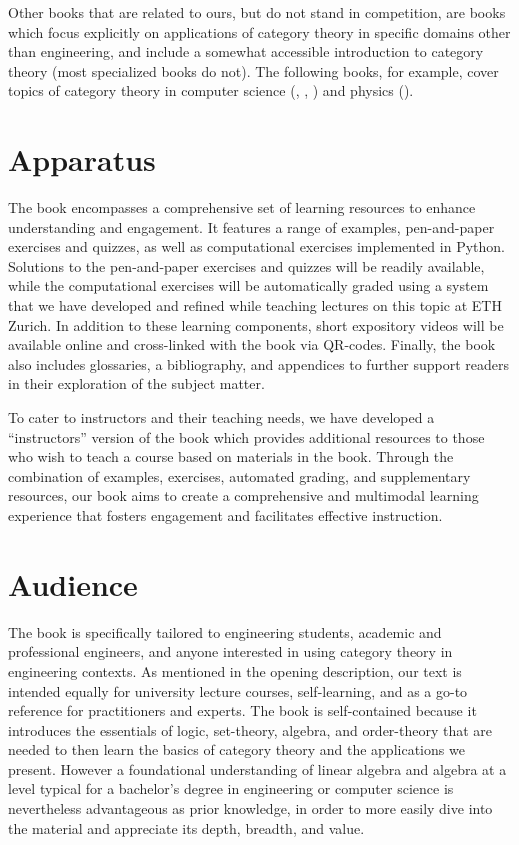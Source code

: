 \documentclass[10pt, article, one side]{memoir}
\begin{document}
    Other books that are related to ours, but do not stand in competition, are books which focus explicitly on applications of category theory in specific domains other than engineering, and include a somewhat accessible introduction to category theory (most specialized books do not).
    The following books, for example, cover topics of category theory in computer science (\cite{BarrWells},  \cite{Milewski}, \cite{Pierce}) and physics (\cite{CoeckeKisssinger}).

    \section{Apparatus}
    The book encompasses a comprehensive set of learning resources to enhance understanding and engagement. It features a range of examples, pen-and-paper exercises and quizzes, as well as computational exercises implemented in Python. Solutions to the pen-and-paper exercises and quizzes will be readily available, while the computational exercises will be automatically graded using a system that we have developed and refined while teaching lectures on this topic at ETH Zurich. In addition to these learning components, short expository videos will be available online and cross-linked with the book via QR-codes. Finally, the book also includes glossaries, a bibliography, and appendices to further support readers in their exploration of the subject matter.

    To cater to instructors and their teaching needs, we have developed a ``instructors'' version of the book which provides additional resources to those who wish to teach a course based on materials in the book. Through the combination of examples, exercises, automated grading, and supplementary resources, our book aims to create a comprehensive and multimodal learning experience that fosters engagement and facilitates effective instruction.

    \section{Audience}
    The book is specifically tailored to engineering students, academic and professional engineers, and anyone interested in using category theory in engineering contexts. As mentioned in the opening description, our text is intended equally for university lecture courses, self-learning, and as a go-to reference for practitioners and experts. The book is self-contained because it introduces the essentials of logic, set-theory, algebra, and order-theory that are needed to then learn the basics of category theory and the applications we present. However a foundational understanding of linear algebra and algebra at a level typical for a bachelor's degree in engineering or computer science is nevertheless advantageous as prior knowledge, in order to more easily dive into the material and appreciate its depth, breadth, and value. 
\end{document}
